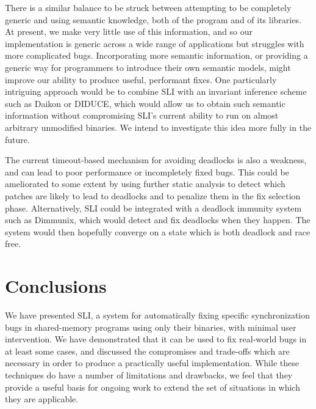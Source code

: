 \documentclass[10pt,letter,twocolumn]{sigplanconf}
\newcommand{\editorial}[1]{}
\begin{document}
There is a similar balance to be struck between attempting to be
completely generic and using semantic knowledge, both of the program
and of its libraries.  At present, we make very little use of this
information, and so our implementation is generic across a wide range
of applications but struggles with more complicated bugs.
Incorporating more semantic information, or providing a generic way
for programmers to introduce their own semantic models, might improve
our ability to produce useful, performant fixes.  One particularly
intriguing approach would be to combine SLI with an invariant
inference scheme such as Daikon\cite{Ernst2007} or
DIDUCE\cite{Hangal2002}, which would allow us to obtain such semantic
information without compromising SLI's current ability to run on
almost arbitrary unmodified binaries.  We intend to investigate this
idea more fully in the future.

The current timeout-based mechanism for avoiding deadlocks is also a
weakness, and can lead to poor performance or incompletely fixed bugs.
This could be ameliorated to some extent by using further static
analysis to detect which patches are likely to lead to deadlocks and
to penalize them in the fix selection phase.  Alternatively, SLI could
be integrated with a deadlock immunity system such as
Dimmunix\cite{Jula2008}, which would detect and fix deadlocks when
they happen.  The system would then hopefully converge on a state
which is both deadlock and race free.

\section{Conclusions}

We have presented SLI, a system for automatically fixing specific
synchronization bugs in shared-memory programs using only their
binaries, with minimal user intervention.  We have demonstrated that
it can be used to fix real-world bugs in at least some cases, and
discussed the compromises and trade-offs which are necessary in order
to produce a practically useful implementation.  While these
techniques do have a number of limitations and drawbacks, we feel that
they provide a useful basis for ongoing work to extend the set of
situations in which they are applicable.\editorial{Wibble wibble
  wibble}




\end{document}
